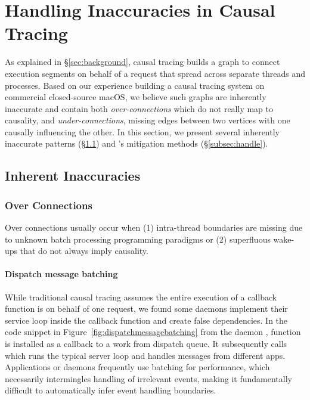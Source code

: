 \section{Handling Inaccuracies in Causal Tracing}\label{sec:inaccuracy}

As explained in \S\ref{sec:background}, causal tracing builds a graph to connect
execution segments on behalf of a request that spread across separate threads
and processes. Based on our experience building a causal tracing system on
commercial closed-source macOS, we believe such graphs are inherently inaccurate
and contain both \emph{over-connections} which do not really map to
causality, and \emph{under-connections}, missing edges between two vertices
with one causally influencing the other. In this section, we present
several inherently inaccurate patterns (\S\ref{subsec:pattern}) and \xxx's
mitigation methods (\S\ref{subsec:handle}).

\subsection{Inherent Inaccuracies} \label{subsec:pattern}



\subsubsection{Over Connections} \label{subsec:overconnections}

Over connections usually occur when (1) intra-thread boundaries are missing due
to unknown batch processing programming paradigms or (2) superfluous wake-ups
that do not always imply causality.

\paragraph{Dispatch message batching}

While traditional causal tracing assumes the entire execution of a callback
function is on behalf of one request, we found some daemons implement their
service loop inside the callback function and create false dependencies. In the
code snippet in Figure~\ref{fig:dispatchmessagebatching} from the 
daemon , function  is installed as a callback to
a work from dispatch queue. It subsequently calls 
which runs the typical server loop and handles messages from different apps.
Applications or daemons frequently use batching for performance, which
necessarily intermingles handling of irrelevant events, making it
fundamentally difficult to automatically infer event handling boundaries.

